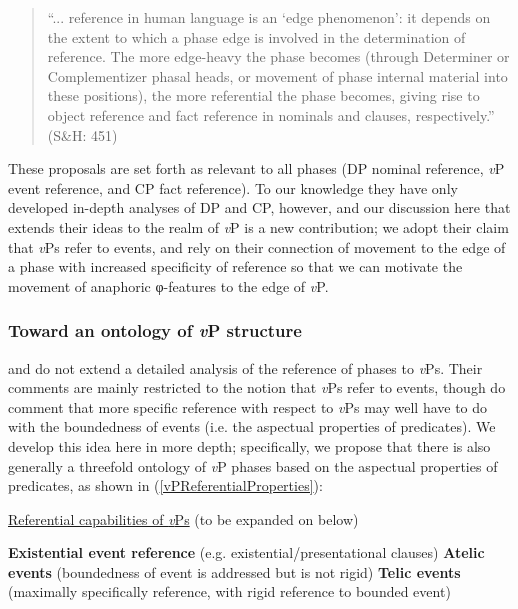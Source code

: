 \documentclass[output=paper
,modfonts
,nonflat
]{langsci/langscibook}
\begin{document}
\begin{quote}
 ``... reference in human language is an `edge phenomenon': it depends on the extent to which a phase edge is involved in the determination of reference. The more edge-heavy the phase becomes (through Determiner or Complementizer phasal heads, or movement of phase internal material into these positions), the more referential the phase becomes, giving rise to object reference and fact reference in nominals and clauses, respectively.'' (S\&H: 451)

\end{quote}
\noindent 
These proposals are set forth as relevant to all phases (DP nominal reference, \textit{v}P event reference, and CP fact reference).  To our knowledge they have only developed in-depth analyses of DP and CP, however, and our discussion here that extends their ideas to the realm of \textit{v}P is a new contribution; we adopt their claim that \textit{v}Ps refer to events, and rely on their connection of movement to the edge of a phase with increased specificity of reference so that we can motivate the movement of anaphoric φ-features to the edge of \textit{v}P. 

\subsubsection{Toward an ontology of \textit{v}P structure}

\citet{SheehanHinzen:2011} and \citet{HinzenSheehan:2013} do not extend a detailed analysis of the reference of phases to \textit{v}Ps. Their comments are mainly restricted to the notion that \textit{v}Ps refer to events, though \citet{SheehanHinzen:2011} do comment that more specific reference with respect to \textit{v}Ps may well have to do with the boundedness of events (i.e. the aspectual properties of predicates). We develop this idea here in more depth; specifically, we propose that there is also generally a threefold ontology of \textit{v}P phases based on the aspectual properties of predicates, as shown in (\ref{vPReferentialProperties}):

\ea \label{vPReferentialProperties} \underline{Referential capabilities of \textit{v}Ps} (to be expanded on below)

\begin{xlist}
\ex \textbf{Existential event reference} (e.g. existential/presentational clauses)
\ex \textbf{Atelic events} (boundedness of event is addressed but is not rigid)
\ex \textbf{Telic events} (maximally specifically reference, with rigid reference to bounded event)
\end{xlist}
\end{document}

